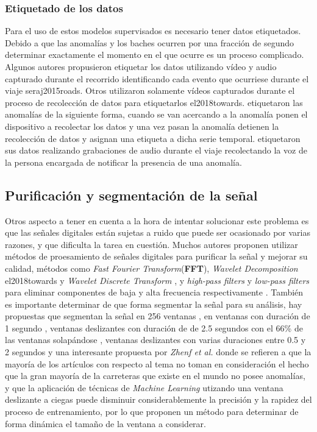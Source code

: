 		\subsubsection{Etiquetado de los datos}
			Para el uso de estos modelos supervisados es necesario tener datos etiquetados. Debido a que las anomalías y los baches ocurren por una 
			fracción de segundo determinar exactamente el momento en el que ocurre es un proceso complicado. Algunos autores propusieron etiquetar
			los datos utilizando vídeo y audio capturado durante el recorrido identificando cada evento que ocurriese durante el viaje \brackcite
			{seraj2015roads}. Otros utilizaron solamente vídeos capturados durante el proceso de recolección de datos para etiquetarlos \brackcite
			{el2018towards}.  etiquetaron las anomalías de la siguiente forma, cuando se van acercando a la anomalía
			ponen el dispositivo a recolectar los datos y una vez pasan la anomalía detienen la recolección de datos y asignan una etiqueta a dicha
			serie temporal.  etiquetaron sus datos realizando grabaciones de audio durante el viaje recolectando la voz 
			de la persona encargada de notificar la presencia de una anomalía.


	\subsection{Purificación y segmentación de la señal}
		Otros aspecto a tener en cuenta a la hora de intentar solucionar este problema es que las señales digitales están sujetas a ruido que puede ser
		ocasionado por varias razones, y que dificulta la tarea en cuestión. Muchos autores proponen utilizar métodos de proesamiento de señales digitales
		para purificar la señal y mejorar su calidad, métodos como \emph{Fast Fourier Transform}(\textbf{FFT}), \emph{Wavelet Decomposition} \brackcite
		{el2018towards} y \emph{Wavelet Discrete Transform} , y \emph{high-pass filters} y \emph{low-pass filters} para eliminar
		componentes de baja y alta frecuencia respectivamente . También es importante determinar de que
		forma segmentar la señal para su análisis, hay propuestas que segmentan la señal en 256 ventanas , en ventanas con
		duración de 1 segundo , ventanas deslizantes con duración de de 2.5 segundos con el 66\% de las ventanas solapándose
		, ventanas deslizantes con varias duraciones entre 0.5 y 2 segundos  y una interesante
		propuesta por \emph{Zhenf et al.} donde se refieren a que la mayoría de los artículos con respecto al tema no toman en consideración el hecho que la
		gran mayoría de la carreteras que existe en el mundo no posee anomalías, y que la aplicación de técnicas de \emph{Machine Learning} utizando
		una ventana deslizante a ciegas puede disminuir considerablemente la precisión y la rapidez del proceso de entrenamiento, por lo que proponen un método
		para determinar de forma dinámica el tamaño de la ventana a considerar.
		
